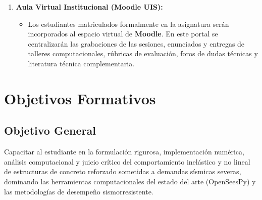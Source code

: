 \documentclass[11pt,letterpaper]{article}
\begin{document}
\begin{resourcebox}
\begin{enumerate}
    \item \textbf{Aula Virtual Institucional (Moodle UIS):}
    \begin{itemize}
        \item Los estudiantes matriculados formalmente en la asignatura serán incorporados al espacio virtual de \textbf{Moodle}. En este portal se centralizarán las grabaciones de las sesiones, enunciados y entregas de talleres computacionales, rúbricas de evaluación, foros de dudas técnicas y literatura técnica complementaria.
    \end{itemize}
\end{enumerate}
\end{resourcebox}

\section{Objetivos Formativos}

\subsection{Objetivo General}
Capacitar al estudiante en la formulación rigurosa, implementación numérica, análisis computacional y juicio crítico del comportamiento inelástico y no lineal de estructuras de concreto reforzado sometidas a demandas sísmicas severas, dominando las herramientas computacionales del estado del arte (OpenSeesPy) y las metodologías de desempeño sismorresistente.
\end{document}
